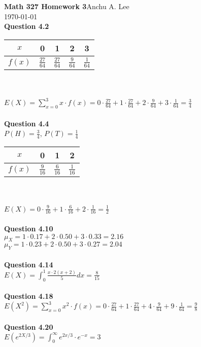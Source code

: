 \documentclass{article}
\begin{document}
    \noindent\textbf{Math 327 Homework 3}\hfill Anchu A. Lee\\
    \noindent\today\\
    
    \noindent\textbf{Question 4.2}\\
        \begin{tabular}{c|c c c c}

            $x$& 0 & 1 & 2 & 3\\
            \hline
            $f(x)$ & $\frac{27}{64}$ & $\frac{27}{64}$ & $\frac{9}{64}$ & $\frac{1}{64}$
        \end{tabular}\\\\
        $E(X) = \sum_{x=0}^{3}x\cdot f(x)= 0\cdot \frac{27}{64} + 1\cdot \frac{27}{64} + 2\cdot \frac{9}{64} + 3\cdot \frac{1}{64} = \frac{3}{4}$\\\\
    \textbf{Question 4.4}\\
        $P(H) = \frac{3}{4}$, $P(T) = \frac{1}{4}$\\
        \begin{tabular}{c|c c c}
            $x$ & 0 & 1 & 2\\
            \hline
            $f(x)$ & $\frac{9}{16}$ & $\frac{6}{16}$ & $\frac{1}{16}$
        \end{tabular}\\\\
        $E(X) = 0\cdot \frac{9}{16} + 1\cdot \frac{6}{16} + 2\cdot \frac{1}{16} = \frac{1}{2}$\\\\
    \textbf{Question 4.10}\\
        $\mu_X = 1\cdot 0.17 + 2\cdot 0.50 + 3\cdot 0.33 = 2.16$\\
        $\mu_Y = 1\cdot 0.23 + 2\cdot 0.50 + 3\cdot 0.27 = 2.04$\\\\
    \textbf{Question 4.14}\\
        $E(X) = \int_0^1\frac{x\cdot 2(x+2)}{5}dx = \frac{8}{15}$\\\\
    \textbf{Question 4.18}\\
        $E(X^2) = \sum_{x=0}^{3}x^2\cdot f(x)= 0\cdot \frac{27}{64} + 1\cdot \frac{27}{64} + 4\cdot \frac{9}{64} + 9\cdot \frac{1}{64} = \frac{9}{8}$\\\\
    \textbf{Question 4.20}\\
        $E(e^{2X/3}) = \int_{0}^{\infty}e^{2x/3}\cdot e^{-x} = 3$\\\\
\end{document}
